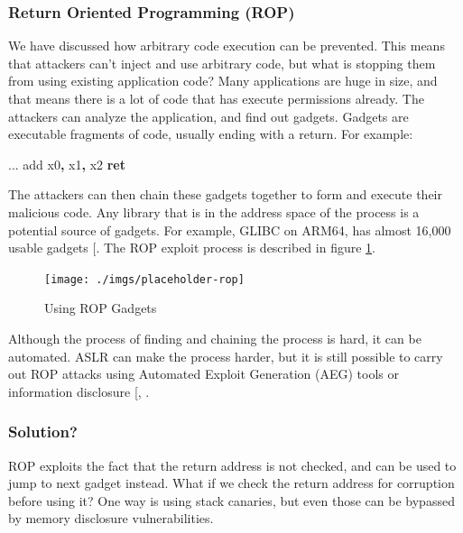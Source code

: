 \documentclass[a4paper, nobind]{templates/ociamthesis}
\newenvironment{Shaded}{\begin{snugshade}}{\end{snugshade}}
\newcommand{\BuiltInTok}[1]{#1}
\newcommand{\ControlFlowTok}[1]{\textcolor[rgb]{0.13,0.29,0.53}{\textbf{#1}}}
\newcommand{\NormalTok}[1]{#1}
\newcommand{\OperatorTok}[1]{\textcolor[rgb]{0.81,0.36,0.00}{\textbf{#1}}}
\renewenvironment{Shaded}
{
  \vspace{10pt}%
  \begin{snugshade}%
}{%
  \end{snugshade}%
  \vspace{8pt}%
}
\begin{document}
\subsubsection{Return Oriented Programming (ROP)}\label{return-oriented-programming-rop}

We have discussed how arbitrary code execution can be prevented.
This means that attackers can't inject and use arbitrary code, but what is stopping
them from using existing application code? Many applications are huge in size,
and that means there is a lot of code that has execute permissions already.
The attackers can analyze the application, and find out gadgets. Gadgets are executable
fragments of code, usually ending with a return. For example:

\begin{Shaded}
\begin{Highlighting}[]
\NormalTok{...}
\BuiltInTok{add}\NormalTok{ x0}\OperatorTok{,}\NormalTok{ x1}\OperatorTok{,}\NormalTok{ x2}
\ControlFlowTok{ret}
\end{Highlighting}
\end{Shaded}

The attackers can then chain these gadgets together to form and execute their malicious code.
Any library that is in the address space of the process is a potential source of gadgets.
For example, GLIBC on ARM64, has almost 16,000 usable gadgets {[}\citeproc{ref-riscyrop}{23}{]}.
The ROP exploit process is described in figure \ref{fig:rop-diag}.

\begin{figure}

{\centering \texttt{[image: ./imgs/placeholder-rop]} 

}

\caption{Using ROP Gadgets}\label{fig:rop-diag}
\end{figure}

Although the process of finding and chaining the process is hard, it can be automated.
ASLR can make the process harder, but it is still possible to carry out ROP attacks using
Automated Exploit Generation (AEG) tools or information disclosure {[}, \citeproc{ref-riscyrop}{23}{]}.

\subsubsection{Solution?}\label{solution}

ROP exploits the fact that the return address is not checked, and can be used to
jump to next gadget instead. What if we check the return address for corruption
before using it? One way is using stack canaries, but even those can be bypassed
by memory disclosure vulnerabilities.
\end{document}
